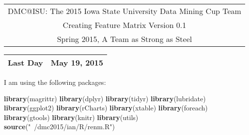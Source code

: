 \documentclass[10pt]{report}
\newenvironment{Shaded}{}{}
\newcommand{\KeywordTok}[1]{\textcolor[rgb]{0.00,0.44,0.13}{\textbf{{#1}}}}
\newcommand{\StringTok}[1]{\textcolor[rgb]{0.25,0.44,0.63}{{#1}}}
\newcommand{\NormalTok}[1]{{#1}}
\begin{document}
\thispagestyle{empty}%
\begin{center}%
    \renewcommand{\arraystretch}{1.5}%
    \begin{tabular}{c}%
       \Large{DMC@ISU: The 2015 Iowa State University Data Mining Cup Team}\\
       Creating Feature Matrix Version 0.1\\
       Spring 2015, A Team as Strong as Steel \\
    \end{tabular}
\end{center}

\begin{center}
 \renewcommand{\arraystretch}{1.5}
 \begin{tabular*}{0.65\textwidth}{r@{:\hspace{.3cm}}l}
    \hline
    
    
    Last Day&  May 19, 2015\\
    \hline
 \end{tabular*}
\end{center}

I am using the following packages:

\begin{Shaded}
\begin{Highlighting}[]
   \KeywordTok{library}\NormalTok{(magrittr)}
   \KeywordTok{library}\NormalTok{(dplyr)}
   \KeywordTok{library}\NormalTok{(tidyr)}
   \KeywordTok{library}\NormalTok{(lubridate)}
   \KeywordTok{library}\NormalTok{(ggplot2)}
   \KeywordTok{library}\NormalTok{(rCharts)}
   \KeywordTok{library}\NormalTok{(xtable)}
   \KeywordTok{library}\NormalTok{(foreach)}
   \KeywordTok{library}\NormalTok{(gtools)}
   \KeywordTok{library}\NormalTok{(knitr)}
   \KeywordTok{library}\NormalTok{(utils)}
   \KeywordTok{source}\NormalTok{(}\StringTok{"~/dmc2015/ian/R/renm.R"}\NormalTok{)}
\end{Highlighting}
\end{Shaded}
\end{document}
